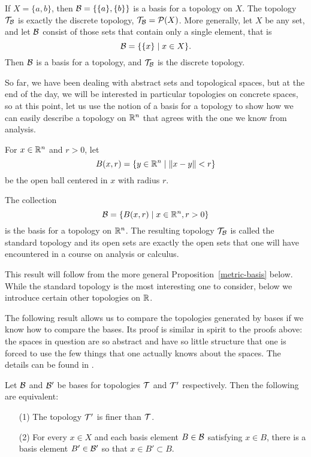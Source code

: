 \begin{example}
  \label{example-discrete-topology}
  If $X = \{a,b\}$, then $\mathcal{B} = \{ \{a\}, \{b\} \}$ is a basis for a topology on $X$. The topology $\mathcal{T}_{\mathcal{B}}$ is exactly the discrete topology, $\mathcal{T}_{\mathcal{B}} = \mathcal{P}(X)$. More generally, let $X$ be any set, and let $\mathcal{B}$ consist of those sets that contain only a single element, that is
  \[
    \mathcal{B} = \{ \{x \} \mid x \in X\}.
  \]
  Then $\mathcal{B}$ is a basis for a topology, and $\mathcal{T}_{\mathcal{B}}$ is the discrete topology.
\end{example}

So far, we have been dealing with abstract sets and topological spaces, but at the end of the day, we will be interested in particular topologies on concrete spaces, so at this point, let us use the notion of a basis for a topology to show how we can easily describe a topology on $\mathbb{R}^n$ that agrees with the one we know from analysis.

For $x \in \mathbb{R}^n$ and $r > 0$, let
\[
  B(x,r) = \{ y \in \mathbb{R}^n \mid \lVert x-y \rVert < r \}
\]
be the open ball centered in $x$ with radius $r$.

\begin{prop}
  \label{basis-euclidean}
  The collection
  \[
    \mathcal{B} = \{ B(x,r) \mid x \in \mathbb{R}^n, r > 0 \}
  \]
  is the basis for a topology on $\mathbb{R}^n$. The resulting topology $\mathcal{T}_{\mathcal{B}}$ is called the standard topology and its open sets are exactly the open sets that one will have encountered in a course on analysis or calculus.
\end{prop}

This result will follow from the more general Proposition~\ref{metric-basis} below. While the standard topology is the most interesting one to consider, below we introduce certain other topologies on $\mathbb{R}$.

The following result allows us to compare the topologies generated by bases if we know how to compare the bases. Its proof is similar in spirit to the proofs above: the spaces in question are so abstract and have so little structure that one is forced to use the few things that one actually knows about the spaces. The details can be found in \cite[Lem.~13.3]{Mun}.

\begin{lem}
  \label{compare-bases}
  Let $\mathcal{B}$ and $\mathcal{B}'$ be bases for topologies $\mathcal{T}$ and $\mathcal{T}'$ respectively. Then the following are equivalent:
  \begin{itemize}
    \item[(1)] The topology $\mathcal{T}'$ is finer than $\mathcal{T}$.
    \item[(2)] For every $x \in X$ and each basis element $B \in \mathcal{B}$ satisfying $x \in B$, there is a basis element $B' \in \mathcal{B}'$ so that $x \in B' \subset B$.
  \end{itemize}
\end{lem}

